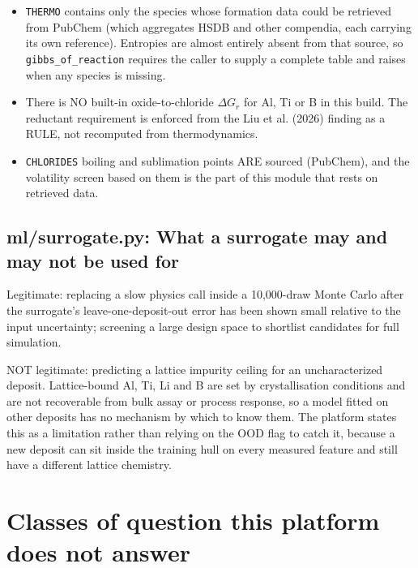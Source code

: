\documentclass[10pt,a4paper,twoside]{report}
\begin{document}
\begin{itemize}
\item \texttt{THERMO} contains only the species whose formation data could be retrieved from PubChem (which aggregates HSDB and other compendia, each carrying its own reference). Entropies are almost entirely absent from that source, so \texttt{gibbs\_of\_reaction} requires the caller to supply a complete table and raises when any species is missing.
\item There is NO built-in oxide-to-chloride $\Delta G_r$ for Al, Ti or B in this build. The reductant requirement is enforced from the Liu et al. (2026) finding as a RULE, not recomputed from thermodynamics.
\item \texttt{CHLORIDES} boiling and sublimation points ARE sourced (PubChem), and the volatility screen based on them is the part of this module that rests on retrieved data.
\end{itemize}

\subsection{ml/surrogate.py: What a surrogate may and may not be used for}

Legitimate: replacing a slow physics call inside a 10,000-draw Monte Carlo after the surrogate's leave-one-deposit-out error has been shown small relative to the input uncertainty; screening a large design space to shortlist candidates for full simulation.

NOT legitimate: predicting a lattice impurity ceiling for an uncharacterized deposit. Lattice-bound Al, Ti, Li and B are set by crystallisation conditions and are not recoverable from bulk assay or process response, so a model fitted on other deposits has no mechanism by which to know them. The platform states this as a limitation rather than relying on the OOD flag to catch it, because a new deposit can sit inside the training hull on every measured feature and still have a different lattice chemistry.

\section{Classes of question this platform does not answer}
\end{document}
